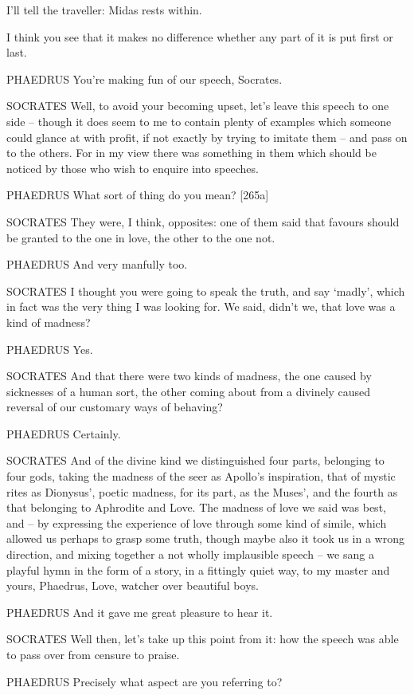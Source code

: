 I'll tell the traveller: Midas rests within.

I think you see that it makes no difference whether any part of 
it is put first or last.

PHAEDRUS You're making fun of our speech, Socrates.

SOCRATES Well, to avoid your becoming upset, let's leave this speech to
one side -- though it does seem to me to contain plenty  of
examples which someone could glance at with profit, if not exactly by
trying to imitate them -- and pass on to the others. For in my view
there was something in them which should be noticed by those who wish to
enquire into speeches.

PHAEDRUS What sort of thing do you mean? {[}265a{]}

SOCRATES They were, I think, opposites: one of them said that favours
should be granted to the one in love, the other to the one not.

PHAEDRUS And very manfully too.

SOCRATES I thought you were going to speak the truth, and  say
‘madly', which in fact was the very thing I was looking for. We said,
didn't we, that love was a kind of madness?

PHAEDRUS Yes.

SOCRATES And that there were two kinds of madness, the one caused by
sicknesses of a human sort, the other coming about  from a
divinely caused reversal of our customary ways of behaving?

PHAEDRUS Certainly. 

SOCRATES And of the divine kind we distinguished four parts, belonging
to four gods, taking the madness of the seer as Apollo's inspiration,
that of mystic rites as Dionysus', poetic madness, for its part, as the
Muses', and the fourth as that belonging to Aphrodite and Love. The
madness of love we said  was best, and -- by expressing the
experience of love through some kind of simile, which allowed us perhaps
to grasp some truth, though maybe also it took us in a wrong direction,
and  mixing together a not wholly implausible speech -- we sang
a playful hymn in the form of a story, in a fittingly quiet way, to my
master and yours, Phaedrus, Love, watcher over beautiful boys.

PHAEDRUS And it gave me great pleasure to hear it.

 SOCRATES Well then, let's take up this point from it: how the
speech was able to pass
over from censure to praise.

PHAEDRUS Precisely what aspect are you referring to?

